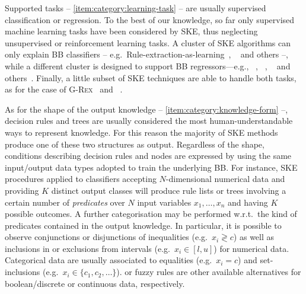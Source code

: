 \documentclass[
]{ceurart}
\begin{document}
Supported tasks -- \cref{item:category:learning-task} -- are usually supervised classification or regression.
%
To the best of our knowledge, so far only supervised machine learning tasks have been considered by SKE, thus neglecting unsupervised or reinforcement learning tasks.
%
A cluster of SKE algorithms can only explain BB classifiers -- e.g.\ Rule-extraction-as-learning~\cite{craven1994using}, \trepan~\cite{craven1996extracting} and others \cite{barakat2005eclectic,martens2007comprehensible} --, while a different cluster is designed to support BB regressors---e.g., \iter~\cite{huysmans2006iter}, \gridex~\cite{gridex-extraamas2021}, \gridrex{}~\cite{gridrex-kr2022} and others~\cite{setiono2002extraction,schmitz1999ann,saito2002extracting}.
%
Finally, a little subset of SKE techniques are able to handle both tasks, as for the case of \textsc{G-Rex}~\cite{grex-icdm2008} and \cart~\cite{breiman1984classification}.

As for the shape of the output knowledge -- \cref{item:category:knowledge-form} --, decision rules \cite{freitas2014comprehensible,huysmans2011empirical,murphy1991id2} and trees \cite{quinlan1993c4,simplifyingdt-ijmms27} are usually considered the most human-understandable ways to represent knowledge.
%
For this reason the majority of SKE methods produce one of these two structures as output.
%
Regardless of the shape, conditions describing decision rules and nodes are expressed by using the same input/output data types adopted to train the underlying BB.
%
For instance, SKE procedures applied to classifiers accepting $N$-dimensional numerical data and providing $K$ distinct output classes will produce rule lists or trees involving a certain number of \emph{predicates} over $N$ input variables $x_1, \ldots, x_n$ and having $K$ possible outcomes.
%
A further categorisation may be performed w.r.t.\ the kind of predicates contained in the output knowledge.
%
In particular, it is possible to observe conjunctions or disjunctions of inequalities (e.g.\ $x_i \gtrless c$) as well as inclusions in or exclusions from intervals (e.g.\ $x_i \in [l, u]$) for numerical data.
%
Categorical data are usually associated to equalities (e.g.\ $x_i = c$) and set-inclusions (e.g.\ $x_i \in \{c_1, c_2, \ldots \}$).
%
\mofn{} or fuzzy rules are other available alternatives for boolean/discrete or continuous data, respectively.
\end{document}
